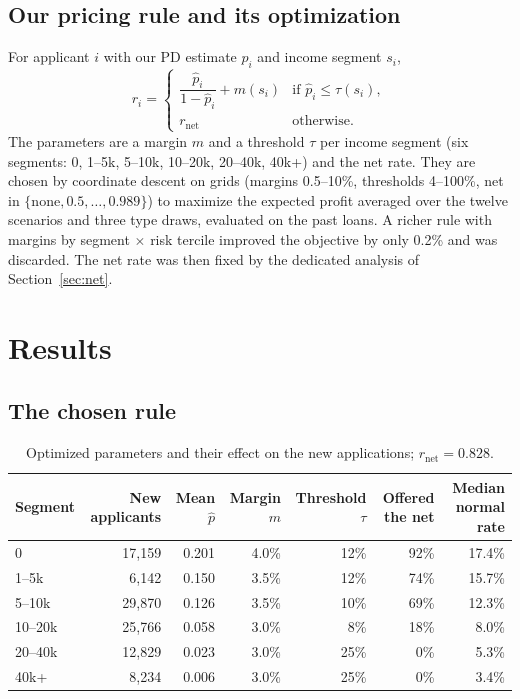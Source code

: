 \documentclass[11pt,a4paper]{article}
\begin{document}
\subsection{Our pricing rule and its optimization}
For applicant $i$ with our PD estimate $\hat p_i$ and income segment $s_i$,
\begin{equation}
  r_i = \begin{cases}
     \dfrac{\hat p_i}{1-\hat p_i} + m(s_i) & \text{if } \hat p_i \le \tau(s_i),\\[8pt]
     r_{\text{net}} & \text{otherwise.}
  \end{cases}
  \label{eq:rule}
\end{equation}
The parameters are a margin $m$ and a threshold $\tau$ per income segment (six segments: 0, 1--5k, 5--10k,
10--20k, 20--40k, 40k+) and the net rate. They are chosen by coordinate descent on grids (margins 0.5--10\%,
thresholds 4--100\%, net in $\{\text{none}, 0.5, \dots, 0.989\}$) to maximize the expected profit averaged over the
twelve scenarios and three type draws, evaluated on the past loans. A richer rule with margins by segment
$\times$ risk tercile improved the objective by only 0.2\% and was discarded. The net rate was then fixed by the
dedicated analysis of Section~\ref{sec:net}.

\section{Results}

\subsection{The chosen rule}
\begin{table}[h]\centering\small
\begin{tabular}{lrrrrrr}
\toprule
Segment & New applicants & Mean $\hat p$ & Margin $m$ & Threshold $\tau$ & Offered the net & Median normal rate\\
\midrule
0       & 17,159 & 0.201 & 4.0\% & 12\% & 92\% & 17.4\%\\
1--5k   &  6,142 & 0.150 & 3.5\% & 12\% & 74\% & 15.7\%\\
5--10k  & 29,870 & 0.126 & 3.5\% & 10\% & 69\% & 12.3\%\\
10--20k & 25,766 & 0.058 & 3.0\% &  8\% & 18\% &  8.0\%\\
20--40k & 12,829 & 0.023 & 3.0\% & 25\% &  0\% &  5.3\%\\
40k+    &  8,234 & 0.006 & 3.0\% & 25\% &  0\% &  3.4\%\\
\bottomrule
\end{tabular}
\caption{Optimized parameters and their effect on the new applications; $r_{\text{net}} = 0.828$.}
\label{tab:rule}
\end{table}
\end{document}

